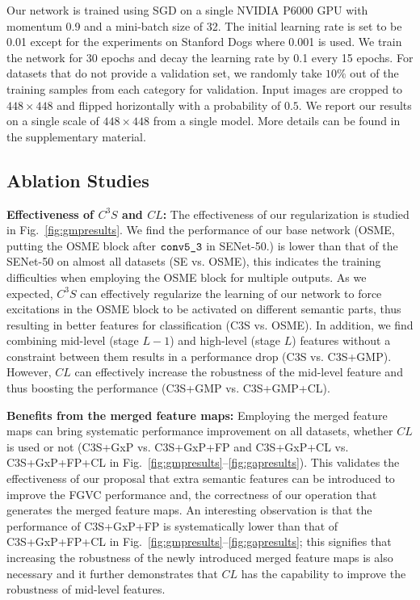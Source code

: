\documentclass[10pt,twocolumn,letterpaper]{article}
\begin{document}
Our network is trained using SGD on a single NVIDIA P6000 GPU with momentum 0.9 and a mini-batch size of 32. The initial learning rate is set to be 0.01 except for the experiments on Stanford Dogs where 0.001 is used. We train the network for 30 epochs and decay the learning rate by 0.1 every 15 epochs. For datasets that do not provide a validation set, we randomly take $10\%$ out of the training samples from each category for validation. Input images are cropped to $448\times 448$ and flipped horizontally with a probability of $0.5$. We report our results on a single scale of $448\times 448$ from a single model. More details can be found in the supplementary material.





\subsection{Ablation Studies}
\label{sec:ablation}
\textbf{Effectiveness of $C^3S$ and $CL$:} The effectiveness of our regularization is studied in Fig.~\ref{fig:gmpresults}. We find the performance of our base network (OSME, putting the OSME block after $\verb'conv5_3'$ in SENet-50.) is lower than that of the SENet-50 on almost all datasets (SE vs. OSME), this indicates the training difficulties when employing the OSME block for multiple outputs. As we expected, $C^3S$ can effectively regularize the learning of our network to force excitations in the OSME block to be activated on different semantic parts, thus resulting in better features for classification (C3S vs. OSME). In addition, we find combining mid-level (stage $L-1$) and high-level (stage $L$) features without a constraint between them results in a performance drop (C3S vs. C3S+GMP). 
However, $CL$ can effectively increase the robustness of the mid-level feature and thus boosting the performance (C3S+GMP vs. C3S+GMP+CL).


\textbf{Benefits from the merged feature maps:} Employing the merged feature maps can bring systematic performance improvement on all datasets, whether $CL$ is used or not (C3S+GxP vs. C3S+GxP+FP and C3S+GxP+CL vs. C3S+GxP+FP+CL in Fig.~\ref{fig:gmpresults}--\ref{fig:gapresults}). This validates the effectiveness of our proposal that extra semantic features can be introduced to improve the FGVC performance and, the correctness of our operation that generates the merged feature maps. An interesting observation is that the performance of C3S+GxP+FP is systematically lower than that of C3S+GxP+FP+CL in Fig.~\ref{fig:gmpresults}--\ref{fig:gapresults}; this signifies that increasing the robustness of the newly introduced merged feature maps is also necessary and it further demonstrates that $CL$ has the capability to improve the robustness of mid-level features.    
\end{document}
